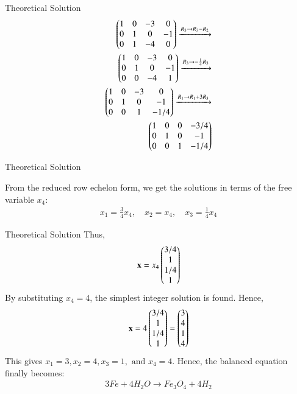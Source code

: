 \documentclass{beamer}
\begin{document}
\begin{frame}{Theoretical Solution}
\begin{align}
\begin{pmatrix}
1 & 0 & -3 & 0 \\
0 & 1 & 0 & -1 \\
0 & 1 & -4 & 0
\end{pmatrix}
\xrightarrow{R_3 \to R_3 - R_2}
\\
\begin{pmatrix}
1 & 0 & -3 & 0 \\
0 & 1 & 0 & -1 \\
0 & 0 & -4 & 1
\end{pmatrix}
\xrightarrow{R_3 \to -\frac{1}{4}R_3}
\\
\begin{pmatrix}
1 & 0 & -3 & 0 \\
0 & 1 & 0 & -1 \\
0 & 0 & 1 & -1/4
\end{pmatrix}
\xrightarrow{R_1 \to R_1 + 3R_3}
\\
\begin{pmatrix}
1 & 0 & 0 & -3/4 \\
0 & 1 & 0 & -1 \\
0 & 0 & 1 & -1/4
\end{pmatrix}
\end{align}
\end{frame}


\begin{frame}{Theoretical Solution}

From the reduced row echelon form, we get the solutions in terms of the free variable $x_4$:
\begin{align}
    x_1 = \frac{3}{4}x_4, \quad x_2 = x_4, \quad x_3 = \frac{1}{4}x_4
\end{align}
\end{frame}


\begin{frame}{Theoretical Solution}
Thus,
\begin{align}
    \mathbf{x} = x_4 \begin{pmatrix} 3/4 \\ 1 \\ 1/4 \\ 1 \end{pmatrix}
\end{align}
By substituting $x_4 = 4$, the simplest integer solution is found. Hence,
\begin{align}
    \mathbf{x} = 4 \begin{pmatrix} 3/4 \\ 1 \\ 1/4 \\ 1 \end{pmatrix} = \begin{pmatrix} 3 \\ 4 \\ 1 \\ 4 \end{pmatrix}
\end{align}
This gives $x_1 = 3, x_2 = 4, x_3 = 1, \text{ and } x_4 = 4$.
\bigskip
Hence, the balanced equation finally becomes:
\begin{align}
    \boxed{3Fe + 4H_2O \to Fe_3O_4 + 4H_2}
\end{align}
\end{frame}
\end{document}
